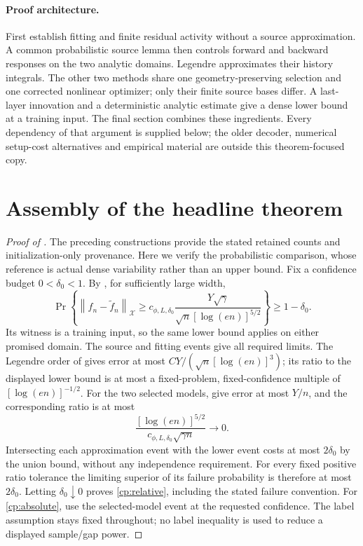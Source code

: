 \documentclass[11pt]{article}
\theoremstyle{definition}
\theoremstyle{remark}
\newcommand{\norm}[1]{\left\lVert#1\right\rVert}
\begin{document}
\paragraph{Proof architecture.}
First establish fitting and finite residual activity without a source
approximation. A common probabilistic source lemma then controls forward and
backward responses on the two analytic domains. Legendre approximates their
history integrals. The other two methods share one geometry-preserving
selection and one corrected nonlinear optimizer; only their finite source
bases differ. A last-layer innovation and a deterministic analytic estimate
give a dense lower bound at a training input. The final section combines
these ingredients. Every dependency of that argument is supplied below;
the older decoder, numerical setup-cost alternatives and empirical material
are outside this theorem-focused copy.






\section{Assembly of the headline theorem}
\label{cp:assembly}
\begin{proof}[Proof of ]
The preceding constructions provide the stated retained counts and
initialization-only provenance. Here we verify the probabilistic comparison,
whose reference is actual dense variability rather than an upper bound.
Fix a confidence budget $0<\delta_0<1$. By , for
sufficiently large width,
\[
 \Pr\left\{\norm{f_n-\widetilde f_n}_{\mathcal X}
 \ge c_{\phi,L,\delta_0}
       \frac{Y\sqrt\gamma}{\sqrt n[\log(en)]^{5/2}}\right\}
 \ge1-\delta_0.
\]
Its witness is a training input, so the same lower bound applies on either
promised domain. The source and fitting events give all required limits.
The Legendre order of  gives error at most
$CY/(\sqrt n[\log(en)]^3)$; its ratio to the displayed lower bound is
at most a fixed-problem, fixed-confidence multiple of
$[\log(en)]^{-1/2}$. For the two selected models,
 give error at most $Y/n$, and the corresponding
ratio is at most
\[
 \frac{[\log(en)]^{5/2}}
 {c_{\phi,L,\delta_0}\sqrt{\gamma n}}\longrightarrow0.
\]
Intersecting each approximation event with the lower event costs at most
$2\delta_0$ by the union bound, without any independence requirement.
For every fixed positive ratio tolerance the limiting superior of its failure
probability is therefore at most $2\delta_0$. Letting $\delta_0\downarrow0$
proves \eqref{cp:relative}, including the stated failure convention.
For \eqref{cp:absolute}, use the selected-model event at the requested
confidence. The label assumption stays fixed throughout; no label inequality
is used to reduce a displayed sample/gap power.
\end{proof}
\end{document}
